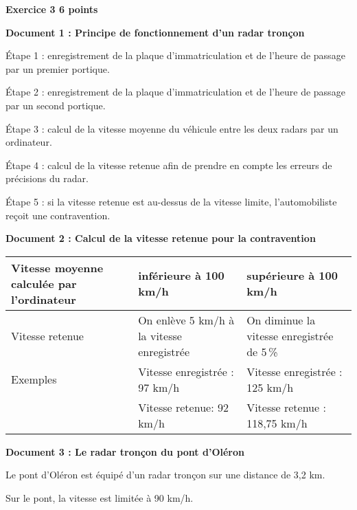 \textbf{Exercice 3 \hfill 6 points}

\medskip

\textbf{Document 1 : Principe de fonctionnement d'un radar tronçon}

\medskip

 Étape 1 : enregistrement de la plaque d'immatriculation et de l'heure de passage par un premier portique. 
 
Étape 2 : enregistrement de la plaque d'immatriculation et de l'heure de passage par un second portique. 

Étape 3 : calcul de la vitesse moyenne du véhicule entre les deux radars par un ordinateur. 

Étape 4 : calcul de la vitesse retenue afin de prendre en compte les erreurs de précisions du radar. 

Étape 5 : si la vitesse retenue est au-dessus de la vitesse limite, l'automobiliste reçoit une contravention. 

\medskip

\textbf{Document 2 : Calcul de la vitesse retenue pour la contravention}

\medskip
\begin{footnotesize}
\begin{tabularx}{\linewidth}{|*{3}{>{\centering \arraybackslash}X|}}\hline     
Vitesse moyenne calculée par  l'ordinateur&  inférieure à 100 km/h&   supérieure à 100 km/h \\ \hline  
Vitesse retenue&On enlève 5 km/h à la vitesse enregistrée&On diminue la vitesse  enregistrée de 5\,\%\\ \hline   
Exemples&Vitesse enregistrée : 97 km/h  & Vitesse enregistrée : 125 km/h   \\
&Vitesse retenue: 92 km/h&Vitesse retenue : 118,75 km/h \\ \hline
\end{tabularx}
\end{footnotesize}

\medskip

\textbf{Document 3 : Le radar tronçon du pont d'Oléron}

\medskip 

Le pont d'Oléron est équipé d'un radar tronçon sur une distance de 3,2 km. 

Sur le pont, la vitesse est limitée à 90 km/h. 

\medskip


